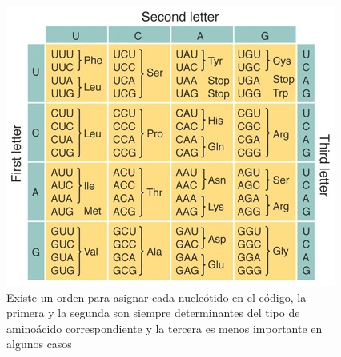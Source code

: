 \documentclass[10pt]{article}
\begin{document}
\begin{figure}[htb!]
\includegraphics[scale=0.4]{./figures/codigo.jpg}
\caption{
Existe un orden para asignar cada nucleótido en el código, la primera y la segunda son siempre determinantes del tipo de aminoácido correspondiente y la tercera es menos importante en algunos casos}

\end{figure}
\end{document}
